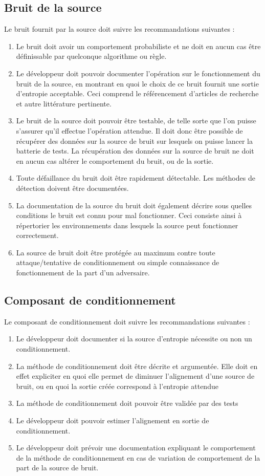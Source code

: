 \subsection{Bruit de la source}
Le bruit fournit par la source doit suivre les recommandations suivantes :
\begin{enumerate}
\item Le bruit doit avoir un comportement probabiliste et ne doit en aucun cas être définissable par quelconque algorithme ou règle.
\item Le développeur doit pouvoir documenter l'opération sur le fonctionnement du bruit de la source, en montrant en quoi le choix de ce bruit fournit une sortie d'entropie acceptable. Ceci comprend le référencement d'articles de recherche et autre littérature pertinente.
\item Le bruit de la source doit pouvoir être testable, de telle sorte que l'on puisse s'assurer qu'il effectue l'opération attendue. Il doit donc être possible de récupérer des données sur la source de bruit sur lesquels on puisse lancer la batterie de tests. La récupération des données sur la source de bruit ne doit en aucun cas altérer le comportement du bruit, ou de la sortie.
\item Toute défaillance du bruit doit être rapidement détectable. Les méthodes de détection doivent être documentées.
\item La documentation de la source du bruit doit également décrire sous quelles conditions le bruit est connu pour mal fonctionner. Ceci consiste ainsi à répertorier les environnements dans lesquels la source peut fonctionner correctement. 
\item La source de bruit doit être protégée au maximum contre toute attaque/tentative de conditionnement ou simple connaissance de fonctionnement de la part d'un adversaire. 
\end{enumerate}

\subsection{Composant de conditionnement}
Le composant de conditionnement doit suivre les recommandations suivantes :
\begin{enumerate}
\item Le développeur doit documenter si la source d'entropie nécessite ou non un conditionnement. 
\item La méthode de conditionnement doit être décrite et argumentée. Elle doit en effet expliciter en quoi elle permet de diminuer l'alignement d'une source de bruit, ou en quoi la sortie créée correspond à l'entropie attendue
\item La méthode de conditionnement doit pouvoir être validée par des tests
\item Le développeur doit pouvoir estimer l'alignement en sortie de conditionnement. 
\item Le développeur doit prévoir une documentation expliquant le comportement de la méthode de conditionnement en cas de variation de comportement de la part de la source de bruit.
\end{enumerate}

